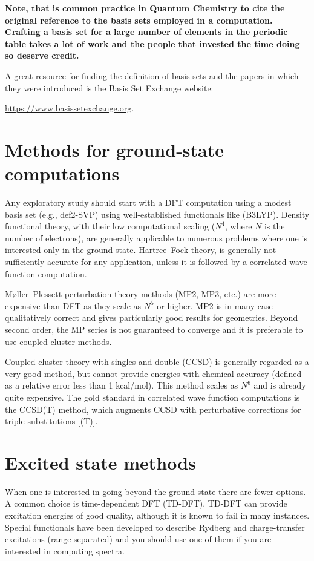 \documentclass[../Main/chem532-notes.tex]{subfiles}
\begin{document}
\textbf{Note, that is common practice in Quantum Chemistry to cite the original reference to the basis sets employed in a computation. Crafting a basis set for a large number of elements in the periodic table takes a lot of work and the people that invested the time doing so deserve credit.}

\begin{ibox}
A great resource for finding the definition of basis sets and the papers in which they were introduced is the Basis Set Exchange website:

\url{https://www.basissetexchange.org}.
\end{ibox}


\section{Methods for ground-state computations}
Any exploratory study should start with a DFT computation using a modest basis set (e.g., def2-SVP) using well-established functionals like (B3LYP).
Density functional theory, with their low computational scaling ($N^4$, where $N$ is the number of electrons), are generally applicable to numerous problems where one is interested only in the ground state.
Hartree--Fock theory, is generally not sufficiently accurate for any application, unless it is followed by a correlated wave function computation.

M{\o}ller--Plessett perturbation theory methods (MP2, MP3, etc.) are more expensive than DFT as they scale as $N^5$ or higher. MP2 is in many case qualitatively correct and gives particularly good results for geometries. Beyond second order, the MP series is not guaranteed to converge and it is preferable to use coupled cluster methods.

Coupled cluster theory with singles and double (CCSD) is generally regarded as a very good method, but cannot provide energies with chemical accuracy (defined as a relative error less than 1 kcal/mol). This method scales as $N^6$ and is already quite expensive.
The gold standard in correlated wave function computations is the CCSD(T) method, which augments CCSD with perturbative corrections for triple substitutions [(T)].

\section{Excited state methods}
When one is interested in going beyond the ground state there are fewer options.
A common choice is time-dependent DFT (TD-DFT). TD-DFT can provide excitation energies of good quality, although it is known to fail in many instances. Special functionals have been developed to describe Rydberg and charge-transfer excitations (range separated) and you should use one of them if you are interested in computing spectra.
\end{document}
